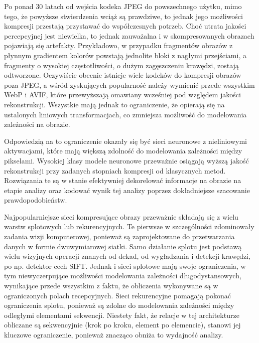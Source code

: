 Po ponad 30 latach od wejścia kodeka JPEG do powszechnego użytku, mimo tego, że powyższe stwierdzenia wciąż są prawdziwe, to jednak jego możliwości kompresji przestają przystawać do współczesnych potrzeb. Choć utrata jakości percepcyjnej jest niewielka, to jednak zauważalna i w skompresowanych obrazach pojawiają się artefakty. Przykładowo, w przypadku fragmentów obrazów z płynnym gradientem kolorów powstają jednolite bloki z nagłymi przejściami, a fragmenty o wysokiej częstotliwości, o dużym zagęszczeniu krawędzi, zostają odtworzone. Oczywiście obecnie istnieje wiele kodeków do kompresji obrazów poza JPEG, a wśród zyskujących popularność należy wymienić przede wszystkim WebP i AVIF, które przewyższają omawiany wcześniej pod względem jakości rekonstrukcji. Wszystkie mają jednak to ograniczenie, że opierają się na ustalonych liniowych transformacjach, co zmniejsza możliwość do modelowania zależności na obrazie. 

Odpowiedzią na to ograniczenie okazały się być sieci neuronowe z nieliniowymi aktywacjami, które mają większą zdolność do modelowania zależności między pikselami. Wysokiej klasy modele neuronowe przeważnie osiągają wyższą jakość rekonstrukcji przy zadanych stopniach kompresji od klasycznych metod.  Rozwiązania te są w stanie efektywniej dekorelować informacje na obrazie na etapie analizy oraz kodować wynik tej analizy poprzez dokładniejsze szacowanie prawdopodobieństw. 

Najpopularniejsze sieci kompresujące obrazy przeważnie składają się z wielu warstw splotowych lub rekurencyjnych. Te pierwsze w szczególności zdominowały zadania wizji komputerowej, ponieważ są zaprojektowane do przetwarzania danych w formie dwuwymiarowej siatki. Samo działanie splotu jest podstawą wielu wizyjnych operacji znanych od dekad, od wygładzania i detekcji krawędzi, po np. detektor cech SIFT. Jednak i sieci splotowe mają swoje ograniczenia, w tym niewyczerpujące możliwości modelowania zależności długodystansowych, wynikające przede wszystkim z faktu, że obliczenia wykonywane są w ograniczonych polach recepcyjnych. Sieci rekurencyjne pomagają pokonać ograniczenia splotu, ponieważ są zdolne do modelowania zależności między odległymi elementami sekwencji. Niestety fakt, że relacje w tej architekturze obliczane są sekwencyjnie (krok po kroku, element po elemencie), stanowi jej kluczowe ograniczenie, ponieważ znacząco obniża to wydajność analizy.

